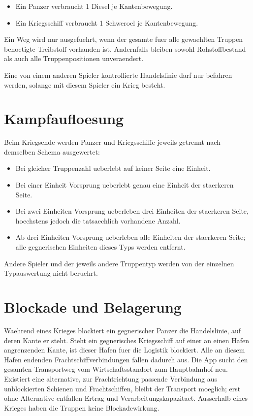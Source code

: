 \documentclass[11pt,a4paper,oneside,parskip=half]{scrreprt}
\begin{document}
\begin{itemize}
  \item Ein Panzer verbraucht 1 Diesel je Kantenbewegung.
  \item Ein Kriegsschiff verbraucht 1 Schweroel je Kantenbewegung.
\end{itemize}

Ein Weg wird nur ausgefuehrt, wenn der gesamte fuer alle gewaehlten Truppen
benoetigte Treibstoff vorhanden ist. Andernfalls bleiben sowohl Rohstoffbestand
als auch alle Truppenpositionen unveraendert.

Eine von einem anderen Spieler kontrollierte Handelslinie darf nur befahren werden, solange mit diesem Spieler ein Krieg besteht.

\section{Kampfaufloesung}
Beim Kriegsende werden Panzer und Kriegsschiffe jeweils getrennt nach demselben
Schema ausgewertet:

\begin{itemize}
  \item Bei gleicher Truppenzahl ueberlebt auf keiner Seite eine Einheit.
  \item Bei einer Einheit Vorsprung ueberlebt genau eine Einheit der staerkeren Seite.
  \item Bei zwei Einheiten Vorsprung ueberleben drei Einheiten der staerkeren Seite, hoechstens jedoch die tatsaechlich vorhandene Anzahl.
  \item Ab drei Einheiten Vorsprung ueberleben alle Einheiten der staerkeren Seite; alle gegnerischen Einheiten dieses Typs werden entfernt.
\end{itemize}

Andere Spieler und der jeweils andere Truppentyp werden von der einzelnen
Typauswertung nicht beruehrt.

\section{Blockade und Belagerung}
Waehrend eines Krieges blockiert ein gegnerischer Panzer die Handelslinie, auf
deren Kante er steht. Steht ein gegnerisches Kriegsschiff auf einer an einen
Hafen angrenzenden Kante, ist dieser Hafen fuer die Logistik blockiert. Alle an
diesem Hafen endenden Frachtschiffverbindungen fallen dadurch aus.
Die App sucht den gesamten Transportweg vom Wirtschaftsstandort zum Hauptbahnhof
neu. Existiert eine alternative, zur Frachtrichtung passende Verbindung aus
unblockierten Schienen und Frachtschiffen, bleibt der Transport moeglich; erst
ohne Alternative entfallen Ertrag und Verarbeitungskapazitaet. Ausserhalb eines
Krieges haben die Truppen keine Blockadewirkung.
\end{document}
